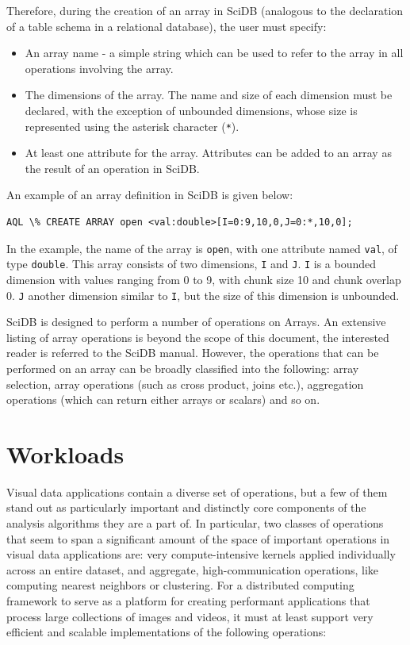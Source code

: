 \documentclass[tog]{acmsiggraph}
\begin{document}
Therefore, during the creation of an array in SciDB (analogous to the
declaration of a table schema in a relational database), the user must specify:

\begin{itemize}
\item An array name - a simple string which can be used to refer to the array
in all operations involving the array.
\item The dimensions of the array. The name and size of each dimension must be
declared, with the exception of unbounded dimensions, whose size is represented
using the asterisk character (\texttt{*}).
\item At least one attribute for the array. Attributes can be added to an array
as the result of an operation in SciDB.
\end{itemize}

An example of an array definition in SciDB is given below:

\begin{lstlisting}[caption=Creating an Array in SciDB, frame=single]
AQL \% CREATE ARRAY open <val:double>[I=0:9,10,0,J=0:*,10,0];
\end{lstlisting}

In the example, the name of the array is \texttt{open}, with one attribute
named \texttt{val}, of type \texttt{double}. This array consists of two
dimensions, \texttt{I} and \texttt{J}. \texttt{I} is a bounded dimension with
values ranging from 0 to 9, with chunk size 10 and chunk overlap 0. \texttt{J}
another dimension similar to \texttt{I}, but the size of this dimension is
unbounded.

SciDB is designed to perform a number of operations on Arrays. An extensive
listing of array operations is beyond the scope of this document, the
interested reader is referred to the SciDB manual\cite{SciDBManual}. However,
the operations that can be performed on an array can be broadly classified into
the following: array selection, array operations (such as cross product, joins
etc.), aggregation operations (which can return either arrays or scalars) and
so on.

\section{Workloads}
Visual data applications contain a diverse set of operations, but a few of them
stand out as particularly important and distinctly core components of the
analysis algorithms they are a part of. In particular, two classes
of operations that seem to span a significant amount of the space of important
operations in visual data applications are: very compute-intensive kernels
applied individually across an entire dataset, and aggregate,
high-communication operations, like computing nearest neighbors or
clustering. For a distributed computing framework to serve as a platform for
creating performant applications that process large collections of images and
videos, it must at least support very efficient and scalable implementations of
the following operations:
\end{document}
